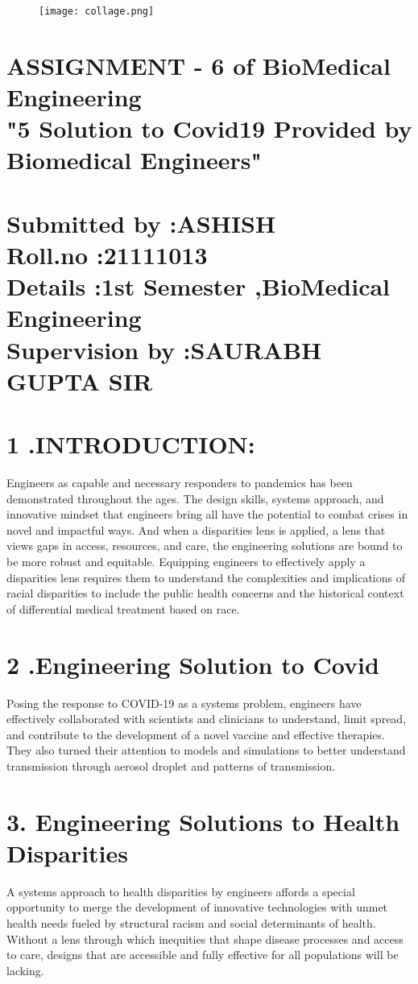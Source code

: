 \documentclass[12pt]{article}
\begin{document}
\begin{figure}

\centering
\texttt{[image: collage.png]}

\end{figure}

\section*{ASSIGNMENT - 6 of BioMedical Engineering\\"5 Solution to Covid19 Provided by Biomedical Engineers"\\\\Submitted by :ASHISH\\Roll.no :21111013\\Details :1st Semester ,BioMedical Engineering\\Supervision by :SAURABH GUPTA SIR}

\clearpage
\section*{ 1 .INTRODUCTION:}
Engineers as capable and necessary responders to pandemics has been demonstrated throughout the ages. The design skills, systems approach, and innovative mindset that engineers bring all have the potential to combat crises in novel and impactful ways. And when a disparities lens is applied, a lens that views gaps in access, resources, and care, the engineering solutions are bound to be more robust and equitable. Equipping engineers to effectively apply a disparities lens requires them to understand the complexities and implications of racial disparities to include the public health concerns and the historical context of differential medical treatment based on race.

\section*{ 2 .Engineering Solution to Covid}
Posing the response to COVID-19 as a systems problem, engineers have effectively collaborated with scientists and clinicians to understand, limit spread, and contribute to the development of a novel vaccine and effective therapies. They also turned their attention to models and simulations to better understand transmission through aerosol droplet and patterns of transmission.

\section*{3. Engineering Solutions to Health Disparities }
A systems approach to health disparities by engineers affords a special opportunity to merge the development of innovative technologies with unmet health needs fueled by structural racism and social determinants of health. Without a lens through which inequities that shape disease processes and access to care, designs that are accessible and fully effective for all populations will be lacking.
\end{document}

